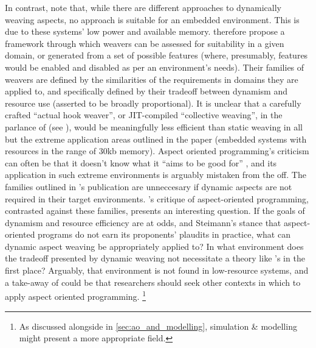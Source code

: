 In contrast, \citeauthor{gilani2004family} note that, while there are different
approaches to dynamically weaving aspects, no approach is suitable for an
embedded environment. This is due to these systems' low power and available
memory. \citeauthor{gilani2004family} therefore propose a framework through
which weavers can be assessed for suitability in a given domain, or generated
from a set of possible features (where, presumably, features would be enabled
and disabled as per an environment's needs). Their families of weavers are
defined by the similarities of the requirements in domains they are applied to,
and specifically defined by their tradeoff between dynamism and resource use
(asserted to be broadly proportional). It is unclear that a carefully crafted
``actual hook weaver'', or JIT-compiled ``collective weaving'', in the parlance
of \citeauthor{dynamicAOchitchyan} (see \citep{dynamicAOchitchyan}), would be
meaningfully less efficient than static weaving in all but the extreme
application areas outlined in the paper (embedded systems with resources in the
range of 30kb memory). Aspect oriented programming's criticism can often be that
it doesn't know what it ``aims to be good for'' , and its application in such
extreme environments is arguably mistaken from the off. The families outlined in
\citeauthor{gilani2004family}'s publication are unneccesary if dynamic aspects
are not required in their target environments.
's critique of aspect-oriented programming,
contrasted against these families, presents an interesting question. If the
goals of dynamism and resource efficiency are at odds, and Steimann's stance
that aspect-oriented programs do not earn its proponents' plaudits in practice,
what can dynamic aspect weaving be appropriately applied to? In what environment
does the tradeoff presented by dynamic weaving not necessitate a theory like
\citeauthor{gilani2004family}'s in the first place? Arguably, that environment
is not found in low-resource systems, and a take-away of \cite{gilani2004family}
could be that researchers should seek other contexts in which to apply aspect
oriented programming. \footnote{As discussed alongside \cite{gulyas1999use} in
\cref{sec:ao_and_modelling}, simulation \& modelling might present a more
appropriate field.}









